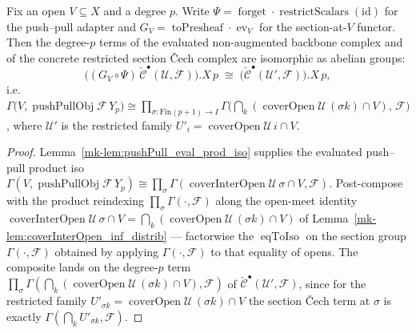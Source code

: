 \begin{lemma}\label{mk-lem:coreIso_obj_iso}
  \leanok

  Fix an open \(V \subseteq X\) and a degree \(p\). Write \(\Psi = \operatorname{forget}\cdot
  \operatorname{restrictScalars}(\mathrm{id})\) for the push--pull adapter and \(G_V =
  \operatorname{toPresheaf}\cdot\operatorname{ev}_V\) for the section-at-\(V\) functor. Then
  the degree-\(p\) terms of the evaluated non-augmented backbone complex and of the concrete
  restricted section {\v C}ech complex are isomorphic as abelian groups:
  \[
    \bigl((G_V\circ\Psi)\,\check{\mathcal{C}}^\bullet(\mathcal{U},\mathcal{F})\bigr).X\,p
      \;\cong\;
    \bigl(\check{\mathcal{C}}^\bullet(\mathcal{U}',\mathcal{F})\bigr).X\,p,
  \]
  i.e.\ \(\Gamma\bigl(V, \operatorname{pushPullObj}\mathcal{F}\,Y_p\bigr) \cong
  \prod_{\sigma : \mathrm{Fin}(p+1)\to I}
  \Gamma\bigl(\bigcap_k(\operatorname{coverOpen}\mathcal{U}\,(\sigma k)\cap V),\,
  \mathcal{F}\bigr)\), where \(\mathcal{U}'\) is the restricted family \(U'_i =
  \operatorname{coverOpen}\mathcal{U}\,i \cap V\).
\end{lemma}
\begin{proof}
  Lemma~\ref{mk-lem:pushPull_eval_prod_iso} supplies the evaluated push--pull product iso
  \(\Gamma(V, \operatorname{pushPullObj}\mathcal{F}\,Y_p) \cong \prod_\sigma
  \Gamma(\operatorname{coverInterOpen}\mathcal{U}\,\sigma \cap V, \mathcal{F})\). Post-compose
  with the product reindexing \(\prod_\sigma \Gamma(\cdot, \mathcal{F})\) along the open-meet
  identity \(\operatorname{coverInterOpen}\mathcal{U}\,\sigma \cap V = \bigcap_k
  (\operatorname{coverOpen}\mathcal{U}\,(\sigma k)\cap V)\) of
  Lemma~\ref{mk-lem:coverInterOpen_inf_distrib} — factorwise the \(\operatorname{eqToIso}\) on the
  section group \(\Gamma(\cdot, \mathcal{F})\) obtained by applying \(\Gamma(\cdot, \mathcal{F})\)
  to that equality of opens. The composite lands on the degree-\(p\) term \(\prod_\sigma
  \Gamma(\bigcap_k(\operatorname{coverOpen}\mathcal{U}\,(\sigma k)\cap V), \mathcal{F})\) of
  \(\check{\mathcal{C}}^\bullet(\mathcal{U}', \mathcal{F})\), since for the restricted family
  \(U'_{\sigma k} = \operatorname{coverOpen}\mathcal{U}\,(\sigma k)\cap V\) the section
  {\v C}ech term at \(\sigma\) is exactly \(\Gamma(\bigcap_k U'_{\sigma k}, \mathcal{F})\).
\end{proof}

